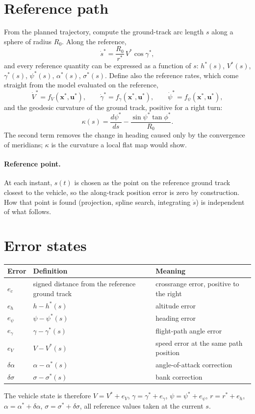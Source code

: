 \documentclass[11pt]{report}
\numberwithin{equation}{chapter}
\newcommand{\vb}[1]{\bm{#1}}
\newcommand{\sdot}{\dot s}
\begin{document}
\section{Reference path}

From the planned trajectory, compute the ground-track arc length $s$ along a sphere of
radius $R_0$. Along the reference,
\begin{equation}
  \sdot^* = \frac{R_0}{r^*}\,V^*\cos\gamma^* ,
\end{equation}
and every reference quantity can be expressed as a function of $s$:
$h^*(s)$, $V^*(s)$, $\gamma^*(s)$, $\psi^*(s)$, $\alpha^*(s)$, $\sigma^*(s)$. Define also the
reference rates, which come straight from the model evaluated on the reference,
\[
  \dot V^* = f_V(\vb x^*,\vb u^*),\qquad
  \dot\gamma^* = f_\gamma(\vb x^*,\vb u^*),\qquad
  \dot\psi^* = f_\psi(\vb x^*,\vb u^*),
\]
and the geodesic curvature of the ground track, positive for a right turn:
\begin{equation}
  \kappa(s) = \frac{d\psi^*}{ds} - \frac{\sin\psi^*\tan\phi^*}{R_0}.
\end{equation}
The second term removes the change in heading caused only by the convergence of meridians;
$\kappa$ is the curvature a local flat map would show.

\paragraph{Reference point.} At each instant, $s(t)$ is chosen as the point on the reference
ground track closest to the vehicle, so the along-track position error is zero by
construction. How that point is found (projection, spline search, integrating $\sdot$) is
independent of what follows.

\section{Error states}

\begin{center}
\begin{tabular}{@{}lll@{}}
\toprule
Error & Definition & Meaning \\
\midrule
$e_c$ & signed distance from the reference ground track & crossrange error, positive to the right \\
$e_h$ & $h - h^*(s)$ & altitude error \\
$e_\psi$ & $\psi - \psi^*(s)$ & heading error \\
$e_\gamma$ & $\gamma - \gamma^*(s)$ & flight-path angle error \\
$e_V$ & $V - V^*(s)$ & speed error at the same path position \\
\midrule
$\delta\alpha$ & $\alpha - \alpha^*(s)$ & angle-of-attack correction \\
$\delta\sigma$ & $\sigma - \sigma^*(s)$ & bank correction \\
\bottomrule
\end{tabular}
\end{center}
The vehicle state is therefore $V = V^*+e_V$, $\gamma = \gamma^*+e_\gamma$,
$\psi=\psi^*+e_\psi$, $r = r^*+e_h$, $\alpha = \alpha^*+\delta\alpha$, $\sigma=\sigma^*+\delta\sigma$,
all reference values taken at the current $s$.
\end{document}
